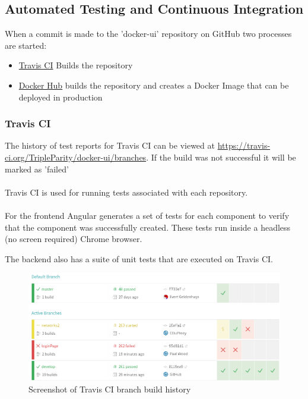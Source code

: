 \documentclass[]{article}
\begin{document}
\subsection{Automated Testing and Continuous Integration}
When a commit is made to the 'docker-ui' repository on GitHub two
processes are started:
\begin{itemize}
	\item \href{https://travis-ci.org/TripleParity/docker-ui/branches}{Travis CI} Builds the repository
	\item \href{https://hub.docker.com/r/tripleparity/docker-ui/builds/}{Docker Hub} builds the repository and creates a Docker Image that can be deployed in production
\end{itemize}

\subsubsection{Travis CI}
The history of test reports for Travis CI can be viewed at \url{https://travis-ci.org/TripleParity/docker-ui/branches}.
If the build was not successful it will be marked as 'failed' \\
\\
Travis CI is used for running tests associated with each repository. \\
\\
For the frontend Angular generates a set of tests for each component to verify
that the component was successfully created. These tests run inside a
headless (no screen required) Chrome browser.

The backend also has a suite of unit tests that are executed on Travis CI.

\begin{figure}[H]
	\centering
	\includegraphics[scale=0.5]{travis_build_history.png}
	\caption{Screenshot of Travis CI branch build history}
\end{figure}
\end{document}
